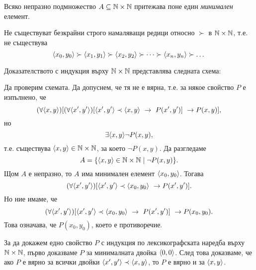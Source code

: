 \begin{prop}
  Всяко непразно подмножество $A\subseteq \Nat\times \Nat$ притежава поне един {\em минимален} елемент.
\end{prop}

\begin{prop}
  Не съществуват безкрайни строго намаляващи редици относно $\succ$ в $\Nat\times\Nat$, т.е.
  не съществува 
  \[\pair{x_0,y_0} \succ \pair{x_1,y_1}\succ \pair{x_2,y_2} \succ \dots \succ \pair{x_n,y_n}\succ\dots\]
\end{prop}

\begin{dfn}
  Доказателството с индукция върху $\Nat\times\Nat$ представлява следната схема:
  \begin{prooftree}
  \end{prooftree}  
\end{dfn}

Да проверим схемата.
Да допуснем, че тя не е вярна, т.е. за някое свойство $P$ е изпълнено, че
\[(\forall\pair{x,y})[(\forall \pair{x^\prime,y^\prime})[\pair{x^\prime,y^\prime} \prec \pair{x,y}\ \rightarrow\ P(x^\prime,y^\prime)]\ \rightarrow P(x,y)],\]
но \[\exists \pair{x,y} \neg P(x,y),\]
т.е. съществува $\pair{x,y} \in \Nat\times\Nat$, за което $\neg P(x,y)$.
Да разгледаме
\[A = \{\pair{x,y}\in \Nat\times\Nat\mid \neg P(x,y)\}.\]
Щом $A$ е непразно, то $A$ има минимален елемент $\pair{x_0,y_0}$.
Тогава
\[(\forall \pair{x^\prime,y^\prime})[\pair{x^\prime,y^\prime} \prec\pair{x_0,y_0}\ \rightarrow P(x^\prime,y^\prime)].\]
Но ние имаме, че 
\[(\forall \pair{x^\prime,y^\prime})[\pair{x^\prime,y^\prime} \prec \pair{x_0,y_0}\ \rightarrow\ P(x^\prime,y^\prime)]\ \rightarrow P(x_0,y_0).\]
Това означава, че $P(x_0,y_0)$, което е противоречие.

\begin{remark}
  За да докажем едно свойство $P$ с индукция по лексикографската наредба върху $\Nat\times\Nat$,
  първо доказваме $P$ за минималната двойка $\pair{0,0}$.
  След това доказваме, че ако $P$ е вярно за всички двойки $\pair{x^\prime,y^\prime}\prec \pair{x,y}$,
  то $P$ е вярно и за $\pair{x,y}$.
\end{remark}

